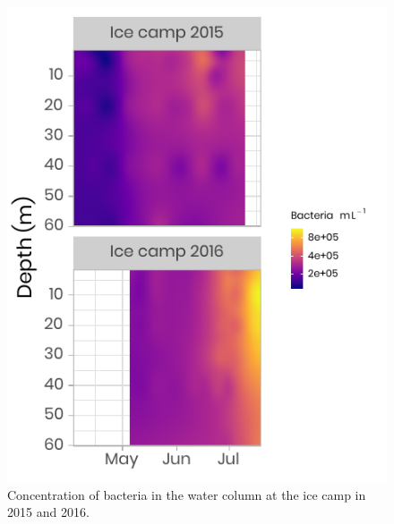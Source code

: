 \documentclass[12pt,a4paper]{scrartcl}
\begin{document}
\begin{figure}[h]
	\centering
	\includegraphics[scale = 2]{../../../graphs/fig09.pdf}
	\caption{Concentration of bacteria in the water column at the ice camp in 2015 and 2016.}
\end{figure}

\clearpage
\newpage
\end{document}
